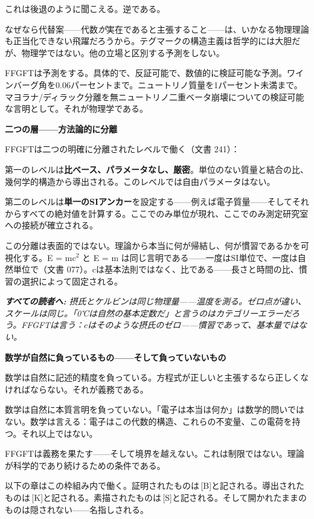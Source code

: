 \documentclass[11pt,openany]{book}
\newcommand{\status}[1]{\penalty10000\,{\tiny\textcolor{gray!70}{[#1]}}}
\newenvironment{laierspur}{%
  \par\vspace{4pt}%
  \noindent\small\itshape\color{blue!60!black}%
  \textbf{すべての読者へ:}\enspace\ignorespaces}{%
  \par\vspace{4pt}\normalsize\normalfont\normalcolor}
\begin{document}
これは後退のように聞こえる。逆である。

なぜなら代替案——代数\textit{が}実在であると主張すること——は、いかなる物理理論も正当化できない飛躍だろうから。テグマークの構造主義は哲学的には大胆だが、物理学ではない。他の立場と区別する予測をしない。

FFGFTは予測をする。具体的で、反証可能で、数値的に検証可能な予測。ワインバーグ角を0.06パーセントまで。ニュートリノ質量を1パーセント未満まで。マヨラナ/ディラック分離を無ニュートリノ二重ベータ崩壊についての検証可能な言明として。それが物理学である。

\textbf{二つの層——方法論的に分離}

FFGFTは二つの明確に分離されたレベルで働く（文書 241）：

第一のレベルは\textbf{比ベース、パラメータなし、厳密}。単位のない質量と結合の比、幾何学的構造から導出される。このレベルでは自由パラメータはない。

第二のレベルは\textbf{単一のSIアンカー}を設定する——例えば電子質量——そしてそれからすべての絶対値を計算する。ここでのみ単位が現れ、ここでのみ測定研究室への接続が確立される。

この分離は表面的ではない。理論から本当に何が帰結し、何が慣習であるかを可視化する。E = mc$^2$ と E = m は同じ言明である——一度はSI単位で、一度は自然単位で（文書 077）。cは基本法則ではなく、比である——長さと時間の比、慣習の選択によって固定される。

\begin{laierspur}
摂氏とケルビンは同じ物理量——温度を測る。ゼロ点が違い、スケールは同じ。「0℃は自然の基本定数だ」と言うのはカテゴリーエラーだろう。FFGFTは言う：$c$はそのような摂氏のゼロ——慣習であって、基本量ではない。
\end{laierspur}

\textbf{数学が自然に負っているもの——そして負っていないもの}

数学は自然に記述的精度を負っている。方程式が正しいと主張するなら正しくなければならない。それが義務である。

数学は自然に本質言明を負っていない。「電子は本当は何か」は数学的問いではない。数学は言える：電子はこの代数的構造、これらの不変量、この電荷を持つ。それ以上ではない。

FFGFTは義務を果たす——そして境界を越えない。これは制限ではない。理論が科学的であり続けるための条件である。

以下の章はこの枠組み内で働く。証明されたものは\status{B}と記される。導出されたものは\status{K}と記される。素描されたものは\status{S}と記される。そして開かれたままのものは隠されない——名指しされる。
\end{document}
